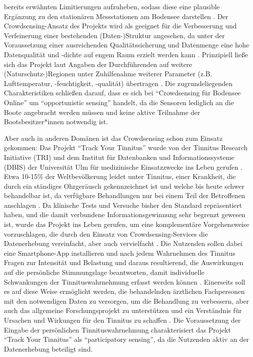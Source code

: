 bereits erwähnten Limitierungen aufzuheben, sodass diese eine plausible Ergänzung zu den stationären Messstationen am Bodensee darstellen \cite{Bodensee2021}. Der Crowdsensing-Ansatz des Projekts wird als geeignet für die Verbesserung und Verfeinerung einer bestehenden (Daten-)Struktur angesehen, da unter der Voraussetzung einer ausreichenden Qualitätssicherung und 
Datenmenge eine hohe Datenqualität und -dichte auf engem Raum erzielt werden kann \cite{Bodensee2021}. Prinzipiell ließe sich das Projekt laut Angaben der Durchführenden auf weitere (Naturschutz-)Regionen unter Zuhilfenahme weiterer Parameter (z.B. Lufttemperatur, -feuchtigkeit, -qualität) übertragen \cite{Bodensee2021}. Die zugrundeliegenden Charakteristiken schließen 
darauf, dass es sich bei \enquote{Crowdsensing für Bodensee Online} um \enquote{opportunistic sensing} handelt, da die Sensoren lediglich an die Boote angebracht werden müssen und keine aktive Teilnahme der Bootsbesitzer*innen notwendig ist. 

Aber auch in anderen Domänen ist das Crowdsensing schon zum Einsatz gekommen: Das Projekt \enquote{Track Your Tinnitus} wurde von der Tinnitus Research Initiative (TRI) und dem Institut für Datenbanken und Informationssysteme (DBIS) der Universität Ulm für medizinische Einsatzzwecke ins Leben gerufen \cite{Pryss2017}. 
Etwa 10-15\% der Weltbevölkerung leidet unter Tinnitus, einer Krankheit, die durch ein ständiges Ohrgeräusch gekennzeichnet ist und welche bis heute schwer behandelbar ist, da verfügbare Behandlungen nur bei einem Teil der Betroffenen anschlagen \cite{langguth2011review}. Da klinische Tests und Versuche bisher den Standard repräsentiert haben, und die damit verbundene Informationsgewinnung 
sehr begrenzt gewesen ist, wurde das Projekt ins Leben gerufen, um eine komplementäre Vorgehensweise vorzuschlagen, die durch den Einsatz von Crowdsensing-Services die Datenerhebung vereinfacht, aber auch vervielfacht \cite{pryss2015mobile}. Die Nutzenden sollen dabei eine Smartphone-App installieren und nach jedem Wahrnehmen des Tinnitus Fragen zur Intensität und Belastung und daraus resultierend, 
die Auswirkungen auf die persönliche Stimmungslage beantworten, damit individuelle Schwankungen der Tinnituswahrnehmung erfasst werden können \cite{pryss2015mobile}. Einerseits soll es auf diese Weise ermöglicht werden, die behandelnden ärztlichen Fachpersonen mit den notwendigen Daten zu versorgen, um die Behandlung zu verbessern, aber auch das allgemeine Forschungsprojekt zu unterstützen und ein 
Verständnis für Ursachen und Wirkungen für den Tinnitus zu schaffen \cite{pryss2015mobile}. Die Voraussetzung der Eingabe der persönlichen Tinnituswahrnehmung charakterisiert das Projekt \enquote{Track Your Tinnitus} als \enquote{participatory sensing}, da die Nutzenden aktiv an der Datenerhebung beteiligt sind.

